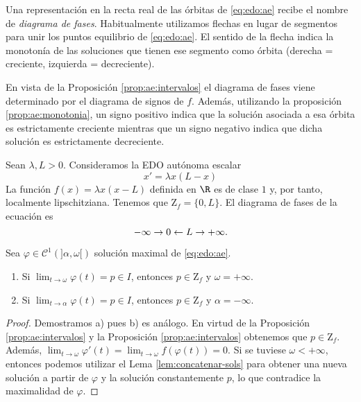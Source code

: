 \documentclass{article}
\begin{document}
\begin{definition}
  Una representación en la recta real de las órbitas de \eqref{eq:edo:ae} recibe el nombre de
  \emph{diagrama de fases}. Habitualmente utilizamos flechas en lugar de segmentos para unir los
  puntos equilibrio de \eqref{eq:edo:ae}. El sentido de la flecha indica la monotonía de las
  soluciones que tienen ese segmento como órbita (derecha = creciente, izquierda = decreciente).
\end{definition}

En vista de la Proposición \ref{prop:ae:intervalos} el diagrama de fases viene determinado por el
diagrama de signos de $f$. Además, utilizando la proposición \ref{prop:ae:monotonia}, un signo
positivo indica que la solución asociada a esa órbita es estrictamente creciente mientras que un
signo negativo indica que dicha solución es estrictamente decreciente.

\begin{ex} \label{ex:logistica} Sean $\lambda, L > 0$. Consideramos la EDO
  autónoma escalar
  \begin{equation}
    \label{eq:log}
    x' = \lambda x(L-x)
  \end{equation}
  La función $f(x) = \lambda x (x -L)$ definida en $\R$ es de clase $1$ y, por tanto, localmente
  lipschitziana. Tenemos que $\mathrm{Z}_f = \{0, L\}$. El diagrama de fases de la ecuación es
  \[-\infty \rightarrow 0 \leftarrow L \rightarrow +\infty. \qedhere\]
\end{ex}

\begin{cor}
  Sea $\varphi \in \mathcal{C}^1(]\alpha, \omega[)$ solución maximal de \eqref{eq:edo:ae}.
  \begin{enumerate}
  \item Si $\lim_{t \to \omega} \varphi(t) = p \in I$, entonces $p \in \mathrm{Z}_f$ y
    $\omega = +\infty$.
  \item Si $\lim_{t \to \alpha} \varphi(t) = p \in I$, entonces $p \in \mathrm{Z}_f$ y
    $\alpha = -\infty$.
  \end{enumerate}
\end{cor}
\begin{proof}
  Demostramos a) pues b) es análogo. En virtud de la Proposición \ref{prop:ae:intervalos} y la
  Proposición \ref{prop:ae:intervalos} obtenemos que $p \in \mathrm{Z}_f$. Además,
  $\lim_{t \to \omega} \varphi'(t) = \lim_{t \to \omega} f(\varphi(t)) = 0$. Si se tuviese
  $\omega < +\infty$, entonces podemos utilizar el Lema \ref{lem:concatenar-sols} para obtener una
  nueva solución a partir de $\varphi$ y la solución constantemente $p$, lo que contradice la
  maximalidad de $\varphi$.
\end{proof}
\end{document}
